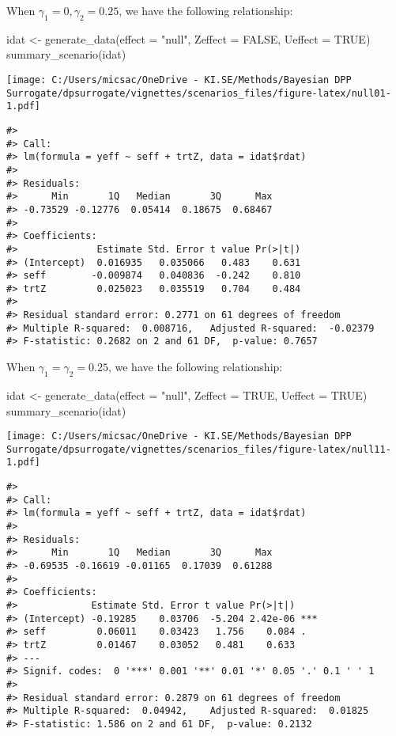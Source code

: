 \documentclass[
]{article}
\newenvironment{Shaded}{\begin{snugshade}}{\end{snugshade}}
\newcommand{\AttributeTok}[1]{\textcolor[rgb]{0.77,0.63,0.00}{#1}}
\newcommand{\ConstantTok}[1]{\textcolor[rgb]{0.00,0.00,0.00}{#1}}
\newcommand{\FunctionTok}[1]{\textcolor[rgb]{0.00,0.00,0.00}{#1}}
\newcommand{\NormalTok}[1]{#1}
\newcommand{\OtherTok}[1]{\textcolor[rgb]{0.56,0.35,0.01}{#1}}
\newcommand{\StringTok}[1]{\textcolor[rgb]{0.31,0.60,0.02}{#1}}
\begin{document}
When \(\gamma_1 = 0, \gamma_2 = 0.25\), we have the following
relationship:

\begin{Shaded}
\begin{Highlighting}[]
\NormalTok{idat }\OtherTok{\textless{}{-}} \FunctionTok{generate\_data}\NormalTok{(}\AttributeTok{effect =} \StringTok{"null"}\NormalTok{, }\AttributeTok{Zeffect =} \ConstantTok{FALSE}\NormalTok{, }\AttributeTok{Ueffect =} \ConstantTok{TRUE}\NormalTok{)}
\FunctionTok{summary\_scenario}\NormalTok{(idat)}
\end{Highlighting}
\end{Shaded}

\texttt{[image: C:/Users/micsac/OneDrive - KI.SE/Methods/Bayesian DPP Surrogate/dpsurrogate/vignettes/scenarios\_files/figure-latex/null01-1.pdf]}

\begin{verbatim}
#> 
#> Call:
#> lm(formula = yeff ~ seff + trtZ, data = idat$rdat)
#> 
#> Residuals:
#>      Min       1Q   Median       3Q      Max 
#> -0.73529 -0.12776  0.05414  0.18675  0.68467 
#> 
#> Coefficients:
#>              Estimate Std. Error t value Pr(>|t|)
#> (Intercept)  0.016935   0.035066   0.483    0.631
#> seff        -0.009874   0.040836  -0.242    0.810
#> trtZ         0.025023   0.035519   0.704    0.484
#> 
#> Residual standard error: 0.2771 on 61 degrees of freedom
#> Multiple R-squared:  0.008716,   Adjusted R-squared:  -0.02379 
#> F-statistic: 0.2682 on 2 and 61 DF,  p-value: 0.7657
\end{verbatim}

When \(\gamma_1 = \gamma_2 = 0.25\), we have the following relationship:

\begin{Shaded}
\begin{Highlighting}[]
\NormalTok{idat }\OtherTok{\textless{}{-}} \FunctionTok{generate\_data}\NormalTok{(}\AttributeTok{effect =} \StringTok{"null"}\NormalTok{, }\AttributeTok{Zeffect =} \ConstantTok{TRUE}\NormalTok{, }\AttributeTok{Ueffect =} \ConstantTok{TRUE}\NormalTok{)}
\FunctionTok{summary\_scenario}\NormalTok{(idat)}
\end{Highlighting}
\end{Shaded}

\texttt{[image: C:/Users/micsac/OneDrive - KI.SE/Methods/Bayesian DPP Surrogate/dpsurrogate/vignettes/scenarios\_files/figure-latex/null11-1.pdf]}

\begin{verbatim}
#> 
#> Call:
#> lm(formula = yeff ~ seff + trtZ, data = idat$rdat)
#> 
#> Residuals:
#>      Min       1Q   Median       3Q      Max 
#> -0.69535 -0.16619 -0.01165  0.17039  0.61288 
#> 
#> Coefficients:
#>             Estimate Std. Error t value Pr(>|t|)    
#> (Intercept) -0.19285    0.03706  -5.204 2.42e-06 ***
#> seff         0.06011    0.03423   1.756    0.084 .  
#> trtZ         0.01467    0.03052   0.481    0.633    
#> ---
#> Signif. codes:  0 '***' 0.001 '**' 0.01 '*' 0.05 '.' 0.1 ' ' 1
#> 
#> Residual standard error: 0.2879 on 61 degrees of freedom
#> Multiple R-squared:  0.04942,    Adjusted R-squared:  0.01825 
#> F-statistic: 1.586 on 2 and 61 DF,  p-value: 0.2132
\end{verbatim}
\end{document}
